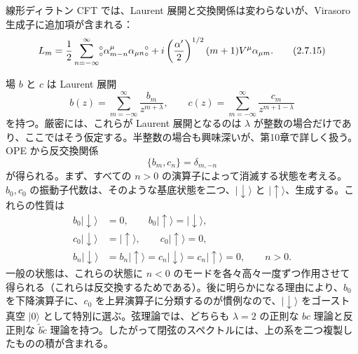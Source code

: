 線形ディラトン CFT では、Laurent 展開と交換関係は変わらないが、Virasoro 生成子に追加項が含まれる：
\begin{equation}
L_m=\frac12\sum_{n=-\infty}^\infty
\mathopen{{}^{\circ}_{\circ}}\alpha_{m-n}^\mu\alpha_{\mu n}\mathclose{{}^{\circ}_{\circ}}
+i\left(\frac{\alpha'}2\right)^{1/2}(m+1)V^\mu\alpha_{\mu m}.
\tag{2.7.15}\label{eq:2.7.15}
\end{equation}


場 $b$ と $c$ は Laurent 展開
\begin{equation}
b(z)=\sum_{m=-\infty}^\infty\frac{b_m}{z^{m+\lambda}},
\qquad
c(z)=\sum_{m=-\infty}^\infty\frac{c_m}{z^{m+1-\lambda}}
\tag{2.7.16}\label{eq:2.7.16}
\end{equation}
を持つ。厳密には、これらが Laurent 展開となるのは $\lambda$ が整数の場合だけであり、ここではそう仮定する。半整数の場合も興味深いが、第10章で詳しく扱う。OPE から反交換関係
\begin{equation}
\{b_m,c_n\}=\delta_{m,-n}
\tag{2.7.17}\label{eq:2.7.17}
\end{equation}
が得られる。まず、すべての $n>0$ の演算子によって消滅する状態を考える。$b_0,c_0$ の振動子代数は、そのような基底状態を二つ、$\lvert\downarrow\rangle$ と $\lvert\uparrow\rangle$、生成する。これらの性質は
\begin{align}
b_0\lvert\downarrow\rangle&=0,\qquad
b_0\lvert\uparrow\rangle=\lvert\downarrow\rangle,
\tag{2.7.18a}\label{eq:2.7.18a}\\
c_0\lvert\downarrow\rangle&=\lvert\uparrow\rangle,\qquad
c_0\lvert\uparrow\rangle=0,
\tag{2.7.18b}\label{eq:2.7.18b}\\
b_n\lvert\downarrow\rangle&=b_n\lvert\uparrow\rangle
=c_n\lvert\downarrow\rangle=c_n\lvert\uparrow\rangle=0,\qquad n>0.
\tag{2.7.18c}\label{eq:2.7.18c}
\end{align}
一般の状態は、これらの状態に $n<0$ のモードを各々高々一度ずつ作用させて得られる（これらは反交換するためである）。後に明らかになる理由により、$b_0$ を下降演算子に、$c_0$ を上昇演算子に分類するのが慣例なので、$\lvert\downarrow\rangle$ をゴースト真空 $\lvert0\rangle$ として特別に選ぶ。弦理論では、どちらも $\lambda=2$ の正則な $bc$ 理論と反正則な $\widetilde b\widetilde c$ 理論を持つ。したがって閉弦のスペクトルには、上の系を二つ複製したものの積が含まれる。

